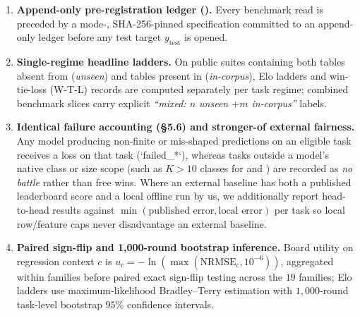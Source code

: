 \begin{enumerate}
  \item \textbf{Append-only pre-registration ledger ().} Every benchmark read is preceded by a mode-, SHA-256-pinned  specification committed to an append-only ledger before any test target $y_{\mathrm{test}}$ is opened.
  \item \textbf{Single-regime headline ladders.} On public suites containing both tables absent from  (\emph{unseen}) and tables present in  (\emph{in-corpus}), Elo ladders and win-tie-loss (W-T-L) records are computed separately per task regime; combined benchmark slices carry explicit \emph{``mixed: $n$ unseen $+ m$ in-corpus''} labels.
  \item \textbf{Identical failure accounting (\S5.6) and stronger-of external fairness.} Any model producing non-finite or mis-shaped predictions on an eligible task receives a loss on that task (`failed\_*`), whereas tasks outside a model's native class or size scope (such as $K > 10$ classes for  and ) are recorded as \emph{no battle} rather than free wins. Where an external baseline has both a published leaderboard score and a local offline run by us, we additionally report head-to-head results against $\min(\text{published error}, \text{local error})$ per task so local row/feature caps never disadvantage an external baseline.
  \item \textbf{Paired sign-flip and 1,000-round bootstrap inference.} Board utility on regression context $c$ is $u_c = -\ln(\max(\mathrm{NRMSE}_c, 10^{-6}))$, aggregated within families before paired exact sign-flip testing across the $19$  families; Elo ladders use maximum-likelihood Bradley--Terry estimation with $1{,}000$-round task-level bootstrap $95\%$ confidence intervals.
\end{enumerate}
